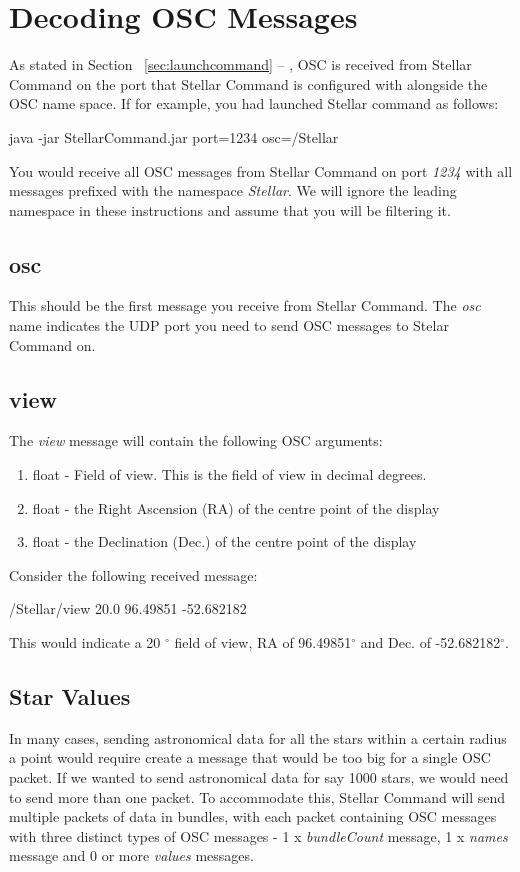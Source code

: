 \chapter{Decoding OSC Messages}
As stated in Section ~\ref{sec:launchcommand} --
\emph{}, OSC is received from Stellar Command on the port that Stellar Command is configured with alongside the OSC name space. If for example, you had launched Stellar command as follows:
\begin{syntax}
	\medskip
	java -jar StellarCommand.jar port=1234 osc=/Stellar  \\
	\medskip
\end{syntax}

You would receive all OSC messages from Stellar Command on port \textit{1234} with all messages prefixed with the namespace \textit{Stellar}. We will ignore the leading namespace in these instructions and assume that you will be filtering it.

\section{osc}
This should be the first message you receive from Stellar Command. The \textit{osc} name indicates the UDP port you need to send OSC messages to Stelar Command on.

\section{view}
The \textit{view} message will contain the following OSC arguments:
\begin{enumerate}
	\item float - Field of view. This is the field of view in decimal degrees. 
	\item float - the Right Ascension (RA) of the centre point of the display
	\item float - the Declination (Dec.) of the centre point of the display
\end{enumerate}
Consider the following received message:
\begin{syntax}
	/Stellar/view 20.0 96.49851 -52.682182  \\
\end{syntax}
\bigskip
This would indicate a 20 $^{\circ}$ field of view, RA of 96.49851$^{\circ}$ and Dec. of -52.682182$^{\circ}$.

\section{Star Values}
In many cases, sending astronomical data for all the stars within a certain radius a point would require create a message that would be too big for a single OSC packet. If we wanted to send astronomical data for say 1000 stars, we would need to send more than one packet. To accommodate this, Stellar Command will send multiple packets of data in bundles, with each packet containing OSC messages with  three distinct types of OSC messages - 1 x \textit{bundleCount} message, 1 x \textit{names} message and 0 or more \textit{values} messages. 

